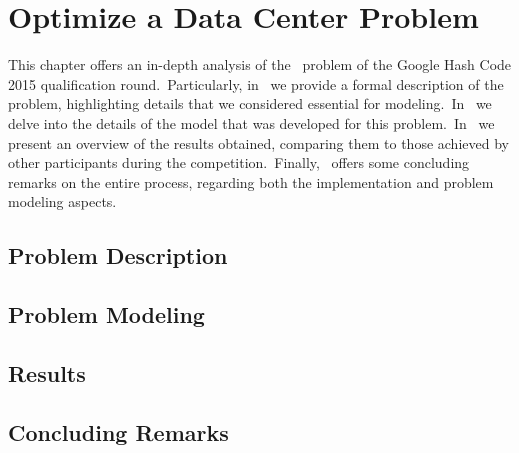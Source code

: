 \chapter{Optimize a Data Center Problem}
\label{ch:optimize-data-center}


This chapter offers an in-depth analysis of
the~ problem of the
Google Hash Code 2015 qualification round.~Particularly,
in~ we provide a formal description of the problem,
highlighting details that we considered essential for
modeling.~In~ we delve into the details of the model that
was developed for this problem.~In~ we present an overview
of the results obtained, comparing them to those achieved by other participants
during the competition.~Finally,~ offers some
concluding remarks on the entire process, regarding both the implementation and
problem modeling aspects.

\section{Problem Description}
\label{sec:odc-problem}


\section{Problem Modeling}
\label{sec:odc-model}


\section{Results}
\label{sec:odc-results}


\section{Concluding Remarks}
\label{sec:odc-concluding-remarks}
